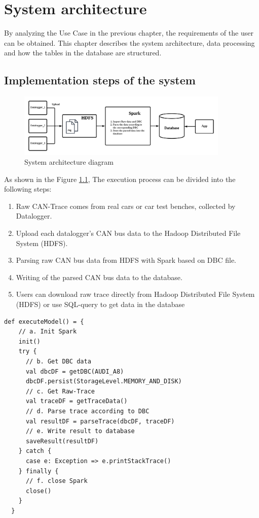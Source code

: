 \chapter{System architecture}
\label{ch:system_architecture}
By analyzing the Use Case in the previous chapter, the requirements of the user can be obtained. This chapter describes the system architecture, data processing and how the tables in the database are structured. 

\section{Implementation steps of the system}

\begin{figure}[hbt!]
    \centering
    \includegraphics[width=0.9\textwidth]{gfx/process.png}
    \caption{System architecture diagram}
    \label{fig:system_architecture}
\end{figure}
As shown in the Figure \ref{fig:system_architecture}, The execution process can be divided into the following steps:
\begin{enumerate}
    \item Raw CAN-Trace comes from real cars or car test benches, collected by Datalogger.
    \item Upload each datalogger's CAN bus data to the Hadoop Distributed File System (HDFS).
    \item Parsing raw CAN bus data from HDFS with Spark based on DBC file.
    \item Writing of the parsed CAN bus data to the database.
    \item Users can download raw trace directly from Hadoop Distributed File System (HDFS) or use SQL-query to get data in the database
\end{enumerate}


\renewcommand{\lstlistingname}{Code} %
\begin{lstlisting}[caption=The entire process via Spark, style=myScalastyle, label=lst:mysql_cp]
  def executeModel() = {
    // a. Init Spark
    init()
    try {
      // b. Get DBC data
      val dbcDF = getDBC(AUDI_A8)
      dbcDF.persist(StorageLevel.MEMORY_AND_DISK)
      // c. Get Raw-Trace
      val traceDF = getTraceData()
      // d. Parse trace according to DBC
      val resultDF = parseTrace(dbcDF, traceDF)
      // e. Write result to database
      saveResult(resultDF)
    } catch {
      case e: Exception => e.printStackTrace()
    } finally {
      // f. close Spark
      close()
    }
  }
\end{lstlisting}




